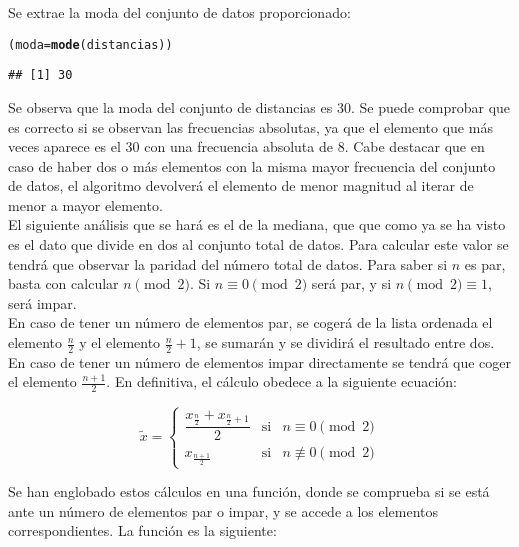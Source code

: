 \documentclass[12pt]{report}\usepackage[]{graphicx}\usepackage[dvipsnames]{xcolor}
\makeatletter
\newcommand{\hlstd}[1]{\textcolor[rgb]{0.345,0.345,0.345}{#1}}%
\newcommand{\hlkwb}[1]{\textcolor[rgb]{0.69,0.353,0.396}{#1}}%
\newcommand{\hlkwd}[1]{\textcolor[rgb]{0.737,0.353,0.396}{\textbf{#1}}}%
\newenvironment{kframe}{%
 \def\at@end@of@kframe{}%
 \ifinner\ifhmode%
  \def\at@end@of@kframe{\end{minipage}}%
  \begin{minipage}{\columnwidth}%
 \fi\fi%
 \def\FrameCommand##1{\hskip\@totalleftmargin \hskip-\fboxsep
 \colorbox{shadecolor}{##1}\hskip-\fboxsep
     \hskip-\linewidth \hskip-\@totalleftmargin \hskip\columnwidth}%
 \MakeFramed {\advance\hsize-\width
   \@totalleftmargin\z@ \linewidth\hsize
   \@setminipage}}%
 {\par\unskip\endMakeFramed%
 \at@end@of@kframe}
\newenvironment{knitrout}{}{} %
\makeatother
\begin{document}
			Se extrae la moda del conjunto de datos proporcionado:
			
\begin{knitrout}
\color{fgcolor}\begin{kframe}
\begin{alltt}
\hlstd{(moda} \hlkwb{=} \hlkwd{mode}\hlstd{(distancias))}
\end{alltt}
\begin{verbatim}
## [1] 30
\end{verbatim}
\end{kframe}
\end{knitrout}
		
			Se observa que la moda del conjunto de distancias es 30. Se puede comprobar que es correcto si se observan las frecuencias absolutas, ya que el elemento que más veces aparece es el 30 con una frecuencia absoluta de 8. Cabe destacar que en caso de haber dos o más elementos con la misma mayor frecuencia del conjunto de datos, el algoritmo devolverá el elemento de menor magnitud al iterar de menor a mayor elemento.\\
			
			El siguiente análisis que se hará es el de la mediana, que que como ya se ha visto es el dato que divide en dos al conjunto total de datos. Para calcular este valor se tendrá que observar la paridad del número total de datos. Para saber si $n$ es par, basta con calcular $n\pmod{2}$. Si $n \equiv 0 \pmod{2}$ será par, y si $n\pmod{2} \equiv 1$, será impar. \\
			
			En caso de tener un número de elementos par, se cogerá de la lista ordenada el elemento $\frac{n}{2}$ y el elemento $\frac{n}{2} + 1$, se sumarán y se dividirá el resultado entre dos. En caso de tener un número de elementos impar directamente se tendrá que coger el elemento $\frac{n+1}{2}$. En definitiva, el cálculo obedece a la siguiente ecuación: 
			
			$$
			\tilde{x} = \left\lbrace\begin{array}{cll}
				\dfrac{x_{\frac{n}{2}} + x_{\frac{n}{2}+1}}{2} & \text{si} & n \equiv 0 \pmod{2}\\
				x_{\frac{n+1}{2}} & \text{si} & n \not\equiv 0 \pmod{2}
			\end{array}\right.
			$$
			
			Se han englobado estos cálculos en una función, donde se comprueba si se está ante un número de elementos par o impar, y se accede a los elementos correspondientes. La función es la siguiente:
			
\end{document}
